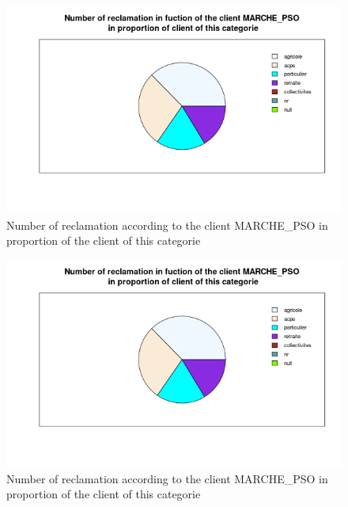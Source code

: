 \documentclass[a4paper, 11pt]{article}
\begin{document}
        \begin{figure}[!ht]
        	\centering
                \includegraphics[height = 10 cm]{Valentin/Number_of_reclamation_in_fuction_of_the_client_MARCHE_PSO_proportion.png}
                \caption{Number of reclamation according to the client MARCHE\_PSO in proportion of the client of this categorie}
                \label{fig:reclamtion_pso2}
        \end{figure}
        
        \begin{figure}[!ht]
        	\centering
                \includegraphics[height = 10 cm]{Valentin/Number_of_reclamation_in_fuction_of_the_client_MARCHE_PSO_proportion.png}
                \caption{Number of reclamation according to the client MARCHE\_PSO in proportion of the client of this categorie}
                \label{fig:reclamtion_pso3}
        \end{figure}
        
\end{document}
